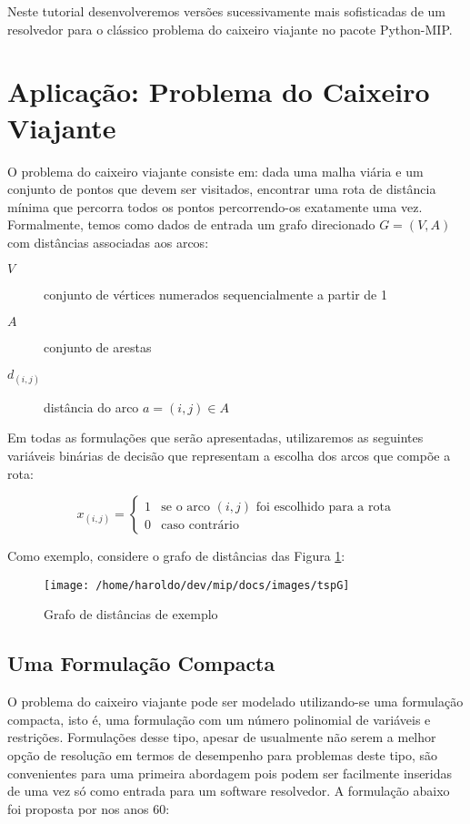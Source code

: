 \documentclass[a4paper,11pt,fleqn]{article}
\begin{document}
Neste tutorial desenvolveremos versões sucessivamente mais sofisticadas
de um resolvedor para o clássico problema do caixeiro viajante no
pacote Python-MIP.

\section{Aplicação: Problema do Caixeiro Viajante}

O problema do caixeiro viajante consiste em: dada uma malha viária
e um conjunto de pontos que devem ser visitados, encontrar uma rota
de distância mínima que percorra todos os pontos percorrendo-os exatamente
uma vez. Formalmente, temos como dados de entrada um grafo direcionado
$G=(V,A)$ com distâncias associadas aos arcos:
\begin{description}
	\item [{$V$}] conjunto de vértices numerados sequencialmente a partir
	de 1
	\item [{$A$}] conjunto de arestas
	\item [{$d_{(i,j)}$}] distância do arco $a=(i,j)\in A$
\end{description}
Em todas as formulações que serão apresentadas, utilizaremos as seguintes
variáveis binárias de decisão que representam a escolha dos arcos
que compõe a rota:

\[
x_{(i,j)}=\begin{cases}
1 & \textrm{se o arco }(i,j)\textrm{ foi escolhido para a rota}\\
0 & \textrm{caso contrário}
\end{cases}
\]

Como exemplo, considere o grafo de distâncias das Figura \ref{figG}:

\begin{figure}
	\begin{centering}
		\texttt{[image: /home/haroldo/dev/mip/docs/images/tspG]}
		\par\end{centering}
	\caption{Grafo de distâncias de exemplo}
	
	\label{figG}
\end{figure}


\subsection{Uma Formulação Compacta}

O problema do caixeiro viajante pode ser modelado utilizando-se uma
formulação compacta, isto é, uma formulação com um número polinomial
de variáveis e restrições. Formulações desse tipo, apesar de usualmente não serem a melhor opção de resolução em termos de desempenho para problemas
deste tipo, são convenientes para uma primeira abordagem pois podem
ser facilmente inseridas de uma vez só como entrada para um software
resolvedor. A formulação abaixo foi proposta por \cite{Miller1960} nos
anos 60:
\end{document}
